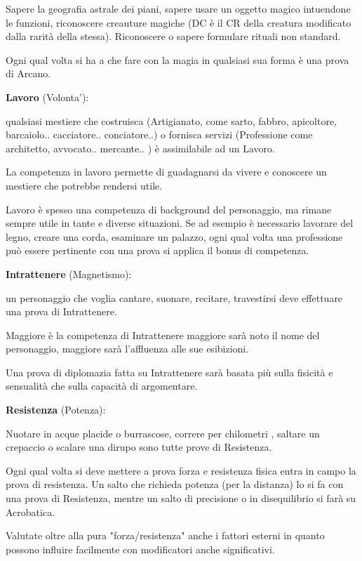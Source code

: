 \documentclass[a4paper,11pt,twoside,openany]{book}
\begin{document}
Sapere la geografia astrale dei piani, sapere usare un oggetto magico intuendone le funzioni, riconoscere creauture magiche (DC è il CR della creatura modificato dalla rarità della stessa). Riconoscere o sapere formulare rituali non standard.

Ogni qual volta si ha a che fare con la magia in qualsiasi sua forma è una prova di Arcano.

\textbf{Lavoro} (Volonta'):

qualsiasi mestiere che costruisca (Artigianato, come sarto, fabbro, apicoltore, barcaiolo.. cacciatore.. conciatore..) o fornisca servizi (Professione come architetto, avvocato.. mercante.. ) è assimilabile ad un Lavoro.

La competenza in lavoro permette di guadagnarsi da vivere e conoscere un mestiere che potrebbe rendersi utile.

Lavoro è spesso una competenza di background del personaggio, ma rimane sempre utile in tante e diverse situazioni. Se ad esempio è necessario lavorare del legno, creare una corda, esaminare un palazzo, ogni qual volta una professione può essere pertinente con una prova si applica il bonus di competenza.

\textbf{Intrattenere} (Magnetismo):

un personaggio che voglia cantare, suonare, recitare, travestirsi deve effettuare una prova di Intrattenere.

Maggiore è la competenza di Intrattenere maggiore sarà noto il nome del personaggio, maggiore sarà l'affluenza alle sue esibizioni.

Una prova di diplomazia fatta su Intrattenere sarà basata più sulla fisicità e sensualità che sulla capacità di argomentare.

\textbf{Resistenza} (Potenza):

Nuotare in acque placide o burrascose, correre per chilometri , saltare un crepaccio o scalare una dirupo sono tutte prove di Resistenza.

Ogni qual volta si deve mettere a prova forza e resistenza fisica entra in campo la prova di resistenza.
Un salto che richieda potenza (per la distanza) lo si fa con una prova di Resistenza, mentre un salto di precisione o in disequilibrio si farà su Acrobatica.

Valutate oltre alla pura "forza/resistenza" anche i fattori esterni in quanto possono influire facilmente con modificatori anche significativi.
\end{document}
